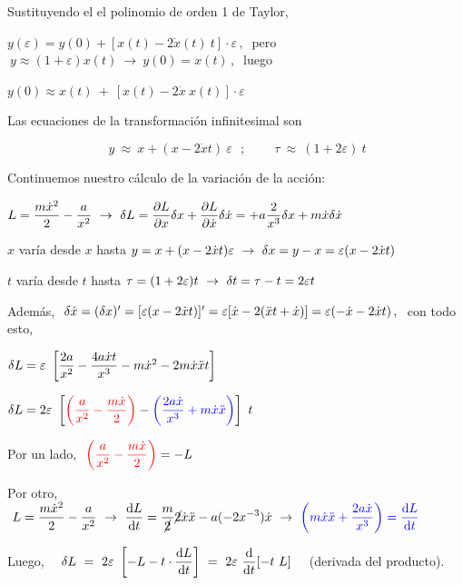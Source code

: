 Sustituyendo el el polinomio de orden 1 de Taylor,

$y(\varepsilon) = y(0)+[x(t)-2\dot x(t) \ t]\cdot \varepsilon\, , \ $ pero $\ y\approx (1+\varepsilon)x(t) \ \to \  y(0)=x(t)\, , \ $ luego

$y(0) \approx x(t) \ + \ [x(t)-2 \dot x \ x(t)]\cdot \varepsilon$


Las ecuaciones de la transformación infinitesimal son


\begin{equation}
\label{T14ecTransInfinitesimal}
\boxed{ \ y \ \approx \ x + (x-2\dot x t)  \  \varepsilon \ }	\ \ ; \qquad \boxed{\    \tau \ \approx \ (1+2\varepsilon)\ t }
\end{equation}


\vspace{5mm} Continuemos nuestro cálculo de la variación de la acción:

$L=\dfrac{m\dot x^2}{2}-\dfrac{a}{x^2} \ \to \ \displaystyle
\var L =\pdv{L}{x}\var x + \pdv{L}{\dot x} \var \dot x = + a \dfrac {2}{x^3} \var x + m\dot x \var \dot x$

$x$ varía desde $x$ hasta $y=x+(x-2\dot x t)\varepsilon \ \to \ \var x = y-x=\varepsilon (x-2\dot x t)$

$t$ varía desde $t$ hasta $\tau=(1+2\varepsilon)t \ \to \ \var  t = \tau - t = 2 \varepsilon t$

Además, $\ \var \dot x = (\var x)' =[\varepsilon(x-2\dot x t) ]'=\varepsilon [\dot x - 2(\ddot x t + \dot x)] =\varepsilon(-\dot x -2\dot x t) \, , \ $ con todo esto,

$\var L = \varepsilon \ \left[ 
\dfrac{2a}{x^2}- \dfrac{4a\dot x t}{x^3} -m\dot x^2 -2m\dot x \ddot x t \right] $

$\var L = 2 \varepsilon \  \left[
\textcolor{red}{\left(  \dfrac{a}{x^2}- \dfrac{m \dot x}{2} \right)} -
\textcolor{blue}{\left( \dfrac{2a\dot x}{x^3} + m\dot x \ddot x \right)} \right] \ t $

Por un lado, $\ \textcolor{red}{\left(  \dfrac{a}{x^2}- \dfrac{m \dot x}{2} \right)} = - L$

Por otro, $\ L=\dfrac{m\dot x^2}{2}-\dfrac{a}{x^2} \ \to \ \displaystyle
\dv{ L}{t} = \dfrac m{\cancel{2}} \cancel{2} \dot x \ddot x - a (-2x^{-3}) \dot x \ \to \  \textcolor{blue}{\left( m\dot x \ddot x +  \dfrac{2a\dot x}{x^3}  \right) = \dv{L}{t} }$

Luego, $\quad \displaystyle \var L \ = \ 2\varepsilon \ \left[ -L - t \cdot \dv{L}{t}\right] \ = \ 2 \varepsilon \ \dv{t} [-t\ L]\ \ \ $  \textcolor{gris}{(derivada del producto).}


